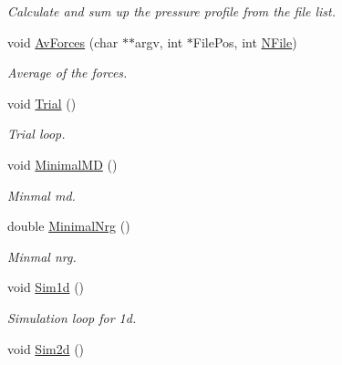 \begin{DoxyCompactItemize}
\begin{DoxyCompactList}\small\item\em Calculate and sum up the pressure profile from the file list. \end{DoxyCompactList}\item 
void \hyperlink{classForces_acf39045486a7e38d437f191e2a845d83}{Av\+Forces} (char $\ast$$\ast$argv, int $\ast$File\+Pos, int \hyperlink{classForces_afc36f5ebb0ee5c1be5fc2161e1fa3959}{N\+File})\hypertarget{classForces_acf39045486a7e38d437f191e2a845d83}{}\label{classForces_acf39045486a7e38d437f191e2a845d83}

\begin{DoxyCompactList}\small\item\em Average of the forces. \end{DoxyCompactList}\item 
void \hyperlink{classForces_a38ef42f2e70e5ed764a0fa0d56757a57}{Trial} ()\hypertarget{classForces_a38ef42f2e70e5ed764a0fa0d56757a57}{}\label{classForces_a38ef42f2e70e5ed764a0fa0d56757a57}

\begin{DoxyCompactList}\small\item\em Trial loop. \end{DoxyCompactList}\item 
void \hyperlink{classForces_a3ee2891acdfca29fc27e89883f2a2df4}{Minimal\+MD} ()\hypertarget{classForces_a3ee2891acdfca29fc27e89883f2a2df4}{}\label{classForces_a3ee2891acdfca29fc27e89883f2a2df4}

\begin{DoxyCompactList}\small\item\em Minmal md. \end{DoxyCompactList}\item 
double \hyperlink{classForces_a8f18498c3494e8fe2476f90f9631c6a8}{Minimal\+Nrg} ()\hypertarget{classForces_a8f18498c3494e8fe2476f90f9631c6a8}{}\label{classForces_a8f18498c3494e8fe2476f90f9631c6a8}

\begin{DoxyCompactList}\small\item\em Minmal nrg. \end{DoxyCompactList}\item 
void \hyperlink{classForces_ae0225eda5d6d3f7a453e0e31f239f21a}{Sim1d} ()\hypertarget{classForces_ae0225eda5d6d3f7a453e0e31f239f21a}{}\label{classForces_ae0225eda5d6d3f7a453e0e31f239f21a}

\begin{DoxyCompactList}\small\item\em Simulation loop for 1d. \end{DoxyCompactList}\item 
void \hyperlink{classForces_a4bd890b646820cd5f60651f61826358e}{Sim2d} ()\hypertarget{classForces_a4bd890b646820cd5f60651f61826358e}{}\label{classForces_a4bd890b646820cd5f60651f61826358e}


\end{DoxyCompactItemize}
